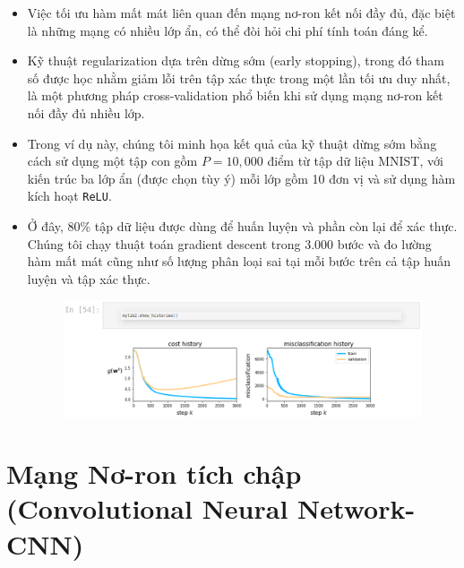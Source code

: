\documentclass{book}
\begin{document}
\begin{itemize}
    \item Việc tối ưu hàm mất mát liên quan đến mạng nơ-ron kết nối đầy đủ, đặc biệt là những mạng có nhiều lớp ẩn, có thể đòi hỏi chi phí tính toán đáng kể.
    \item Kỹ thuật regularization dựa trên dừng sớm (early stopping), trong đó tham số được học nhằm giảm lỗi trên tập xác thực trong một lần tối ưu duy nhất, là một phương pháp cross-validation phổ biến khi sử dụng mạng nơ-ron kết nối đầy đủ nhiều lớp.
    \item Trong ví dụ này, chúng tôi minh họa kết quả của kỹ thuật dừng sớm bằng cách sử dụng một tập con gồm $P=10,000$ điểm từ tập dữ liệu MNIST, với kiến trúc ba lớp ẩn (được chọn tùy ý) mỗi lớp gồm 10 đơn vị và sử dụng hàm kích hoạt \texttt{ReLU}.
    \item Ở đây, 80\% tập dữ liệu được dùng để huấn luyện và phần còn lại để xác thực. Chúng tôi chạy thuật toán gradient descent trong 3.000 bước và đo lường hàm mất mát cũng như số lượng phân loại sai tại mỗi bước trên cả tập huấn luyện và tập xác thực.
    \begin{figure}[H]
        \centering
        \includegraphics[width=1.0\linewidth]{images/earlystopping.png}
        \label{fig:earlystopping}
    \end{figure}
\end{itemize}



\chapter{Mạng Nơ-ron tích chập (Convolutional Neural Network-CNN)}
\end{document}
